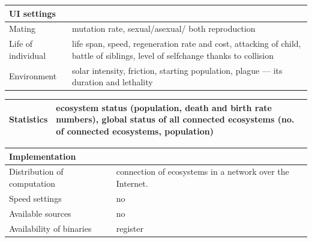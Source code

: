 \documentclass[a4paper,12pt]{report}
\begin{document}
 \vspace{10pt}
 \begin{tabular}{|p{150pt}|p{220pt}|} \hline \textbf{UI settings}&\\ \hline
Mating&mutation rate, sexual/asexual/ both reproduction\\ \hline
Life of individual&life span, speed, regeneration rate and cost, attacking of child, battle of siblings, level of selfchange thanks to collision\\ \hline
Environment&solar intensity, friction, starting population, plague --- its duration and lethality\\ \hline
\end{tabular} 

 \vspace{10pt}
 \begin{tabular}{|p{150pt}|p{220pt}|} \hline \textbf{Statistics}&ecosystem status (population, death and birth rate numbers), global status of all connected ecosystems (no. of connected ecosystems, population)\\ \hline
\end{tabular} 

 \vspace{10pt}
 \begin{tabular}{|p{150pt}|p{220pt}|} \hline \textbf{Implementation}&\\ \hline
Distribution of computation&connection of ecosystems in a network over the Internet.\\ \hline
Speed settings&no\\ \hline
Available sources&no\\ \hline
Availability of binaries&register\\ \hline

\end{tabular}
\end{document}
